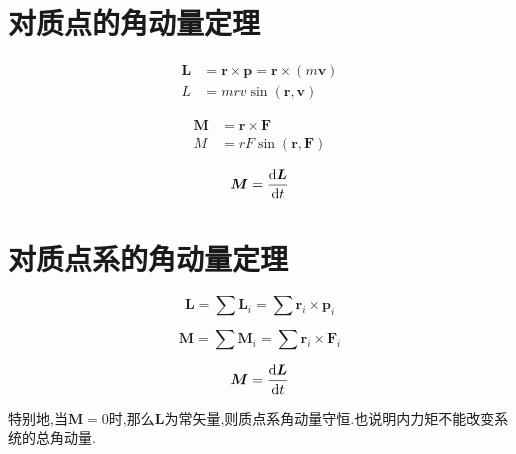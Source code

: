 \newpage
\section{对质点的角动量定理}
\begin{equation}
\begin{split}
\bm{L}&=\bm{r}\times \bm{p}=\bm{r}\times(m\bm{v})\\
L&=mrv\sin(\bm{r},\bm{v})
\end{split}
\end{equation}
\par {}
\begin{equation}
\begin{split}
\bm{M}&=\bm{r}\times \bm{F}\\
M&=rF\sin(\bm{r},\bm{F})
\end{split}
\end{equation}
\par {}
\begin{equation}
\bm{M}=\frac{{\rm{d}} \bm{L}}{{\rm{d}} t}
\end{equation}

\section{对质点系的角动量定理}
\begin{equation}
\bm{L}=\sum \bm{L}_i=\sum \bm{r}_i\times \bm{p}_i
\end{equation}

\par {}
\begin{equation}
\bm{M}=\sum \bm{M}_i =\sum \bm{r}_i\times \bm{F}_i
\end{equation}
\par {}
\begin{equation}
\bm{M}=\frac{{\rm{d}} \bm{L}}{{\rm{d}} t}
\end{equation}
\par 特别地,当$\bm{M}=0$时,那么$\bm{L}$为常矢量,则质点系角动量守恒.也说明内力矩不能改变系统的总角动量.




